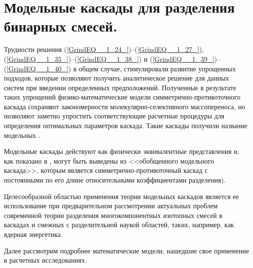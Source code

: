 \chapter{Модельные каскады для разделения бинарных смесей.}


Трудности решения (\ref{GrindEQ__1_24_})--(\ref{GrindEQ__1_27_}), (\ref{GrindEQ__1_35_})--(\ref{GrindEQ__1_38_}) и (\ref{GrindEQ__1_39_})--(\ref{GrindEQ__1_40_}) в общем случае, стимулировали развитие упрощенных подходов, которые позволяют получить аналитическое решение для данных систем при введении определенных предположений. Полученные в результате таких упрощений физико-математические модели симметрично-противоточного каскада сохраняют закономерности молекулярно-селективного массопереноса, но позволяют заметно упростить соответствующие расчетные процедуры для определения оптимальных параметров каскада. Такие каскады получили название модельных \cite{minenkoTeoriiKaskadovDlya1965, delagarzaMulticomponentIsotopeSeparation1961, zhigalovskiyLekcionnyeMaterialyPo1999, kolokoltsovDesignCascadesSeparating1970, kolokolcovVoprosuPostroeniiKaskadov1970, minenkoPredelnoeObogashcheniePromezhutochnyh1972, yamamotoMulticomponentIsotopeSeparating1978, wuStudyMulticomponentIsotope, borisevichRascheteKaskadovDopolnitelnym1993, woodCriterionEffiencyMultiisotope1999, sulaberidzeOsobennostiObogashcheniyaKomponentov2006, sazykinKvaziidealnyeKaskadyDlya2000, sulaberidzeSravnenieOptimalnyhModelnyh2008}.

Модельные каскады действуют как физически эквивалентные представления и, как показано в \cite{sulaberidzeClassificationModelCascades2020}, могут быть выведены из <<обобщенного модельного каскада>>, которым является симметрично-противоточный каскад с постоянными по его длине относительными коэффициентами разделения).

Целесообразной областью применения теории модельных каскадов является ее использование при предварительном рассмотрении актуальных проблем современной теории разделения многокомпонентных изотопных смесей в каскадах и смежных с разделительной наукой областей, таких, например, как ядерная энергетика.

Далее рассмотрим подробнее математические модели, нашедшие свое применение в расчетных исследованиях.


